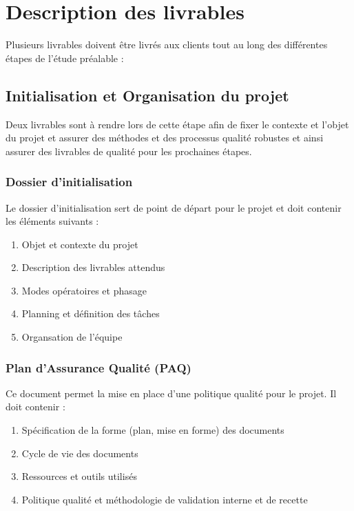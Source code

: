 \chapter{Description des livrables}

Plusieurs livrables doivent être livrés aux clients tout au long des différentes étapes de l'étude préalable :

	\section{Initialisation et Organisation du projet}

		Deux livrables sont à rendre lors de cette étape afin de fixer le contexte et l'objet du projet et assurer des méthodes et des processus qualité robustes et ainsi assurer des livrables de qualité pour les prochaines étapes.

		\subsection{Dossier d'initialisation}

		Le dossier d'initialisation sert de point de départ pour le projet et doit contenir les éléments suivants :

		\begin{enumerate}
			\item Objet et contexte du projet
			\item Description des livrables attendus
			\item Modes opératoires et phasage
			\item Planning et définition des tâches
			\item Organsation de l'équipe
		\end{enumerate}

		\subsection{Plan d'Assurance Qualité (PAQ)}

		Ce document permet la mise en place d'une politique qualité pour le projet. Il doit contenir :

		\begin{enumerate}
			\item Spécification de la forme (plan, mise en forme) des documents
			\item Cycle de vie des documents
			\item Ressources et outils utilisés
			\item Politique qualité et méthodologie de validation interne et de recette
		\end{enumerate}

